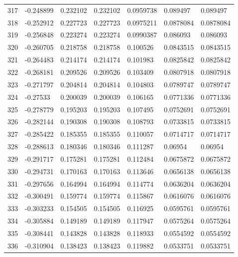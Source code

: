 \begin{longtable}{l|lll|lll}
 317 & -0.248899    & 0.232102    & 0.232102    &  0.0959738   & 0.089497    & 0.089497    \\
 318 & -0.252912    & 0.227723    & 0.227723    &  0.0975211   & 0.0878084   & 0.0878084   \\
 319 & -0.256848    & 0.223274    & 0.223274    &  0.0990387   & 0.086093    & 0.086093    \\
 320 & -0.260705    & 0.218758    & 0.218758    &  0.100526    & 0.0843515   & 0.0843515   \\
 321 & -0.264483    & 0.214174    & 0.214174    &  0.101983    & 0.0825842   & 0.0825842   \\
 322 & -0.268181    & 0.209526    & 0.209526    &  0.103409    & 0.0807918   & 0.0807918   \\
 323 & -0.271797    & 0.204814    & 0.204814    &  0.104803    & 0.0789747   & 0.0789747   \\
 324 & -0.27533     & 0.200039    & 0.200039    &  0.106165    & 0.0771336   & 0.0771336   \\
 325 & -0.278779    & 0.195203    & 0.195203    &  0.107495    & 0.0752691   & 0.0752691   \\
 326 & -0.282144    & 0.190308    & 0.190308    &  0.108793    & 0.0733815   & 0.0733815   \\
 327 & -0.285422    & 0.185355    & 0.185355    &  0.110057    & 0.0714717   & 0.0714717   \\
 328 & -0.288613    & 0.180346    & 0.180346    &  0.111287    & 0.06954     & 0.06954     \\
 329 & -0.291717    & 0.175281    & 0.175281    &  0.112484    & 0.0675872   & 0.0675872   \\
 330 & -0.294731    & 0.170163    & 0.170163    &  0.113646    & 0.0656138   & 0.0656138   \\
 331 & -0.297656    & 0.164994    & 0.164994    &  0.114774    & 0.0636204   & 0.0636204   \\
 332 & -0.300491    & 0.159774    & 0.159774    &  0.115867    & 0.0616076   & 0.0616076   \\
 333 & -0.303233    & 0.154505    & 0.154505    &  0.116925    & 0.0595761   & 0.0595761   \\
 334 & -0.305884    & 0.149189    & 0.149189    &  0.117947    & 0.0575264   & 0.0575264   \\
 335 & -0.308441    & 0.143828    & 0.143828    &  0.118933    & 0.0554592   & 0.0554592   \\
 336 & -0.310904    & 0.138423    & 0.138423    &  0.119882    & 0.0533751   & 0.0533751   \\

\end{longtable}
